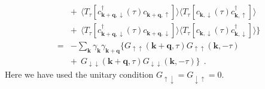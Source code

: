 \documentclass[a4j]{jsarticle}
\begin{document}
\begin{eqnarray}
	\nonumber \\[2mm] && + \ \
	\langle T_{\tau} [
			c_{ \bm{k}+\bm{q} , \downarrow }^{\dagger} (\tau)
			c_{ \bm{k}+\bm{q} , \uparrow }
		] \rangle
	\langle T_{\tau} [
			c_{ \bm{k} , \downarrow } (\tau)
			c_{ \bm{k} , \uparrow }^{\dagger}
		] \rangle
	\nonumber \\[2mm] && + \ \
	\langle T_{\tau} [
			c_{ \bm{k}+\bm{q} , \downarrow }^{\dagger} (\tau)
			c_{ \bm{k}+\bm{q} , \downarrow }
		] \rangle
	\langle T_{\tau} [
			c_{ \bm{k} , \downarrow } (\tau)
			c_{ \bm{k} , \downarrow }^{\dagger}
		] \rangle
	\Big\}
	\nonumber \\[3mm]
	&=&
	-
	\sum_{ \bm{k} }
	\gamma_{\bm{k}}
	\gamma_{\bm{k}+\bm{q}}
	\Big\{
	G_{\uparrow \uparrow}( \bm{k}+\bm{q} , \tau)
	G_{\uparrow \uparrow}( \bm{k} , - \tau)
	\nonumber \\[-1mm] && + \ \
	G_{\downarrow \downarrow}( \bm{k}+\bm{q} , \tau)
	G_{\downarrow \downarrow}( \bm{k} , - \tau)
	\Big\}
	\ \ .
\end{eqnarray}
%
%
%
%
Here we have used the unitary condition $G_{\uparrow \downarrow} = G_{\downarrow \uparrow} = 0$.
\end{document}
